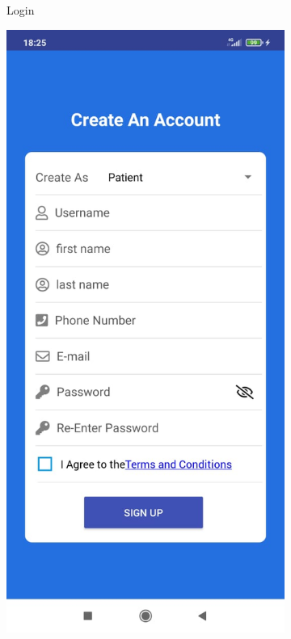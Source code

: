 \begin{figure}
\begin{subfigure}[b]{0.125\textwidth}
        \caption{Login}
        \label{fig:login}
    \end{subfigure}
    \hfill %
    \begin{subfigure}[b]{0.125\textwidth}
        \includegraphics[width=\textwidth]{figs/mobapp/img3.jpeg}

\end{subfigure}
\end{figure}
